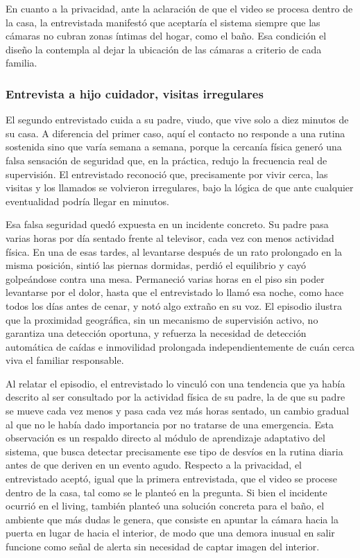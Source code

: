 En cuanto a la privacidad, ante la aclaración de que el video se procesa dentro de la casa, la entrevistada manifestó que aceptaría el sistema siempre que las cámaras no cubran zonas íntimas del hogar, como el baño.
Esa condición el diseño la contempla al dejar la ubicación de las cámaras a criterio de cada familia.

\subsubsection{Entrevista a hijo cuidador, visitas irregulares}

El segundo entrevistado cuida a su padre, viudo, que vive solo a diez minutos de su casa.
A diferencia del primer caso, aquí el contacto no responde a una rutina sostenida sino que varía semana a semana, porque la cercanía física generó una falsa sensación de seguridad que, en la práctica, redujo la frecuencia real de supervisión.
El entrevistado reconoció que, precisamente por vivir cerca, las visitas y los llamados se volvieron irregulares, bajo la lógica de que ante cualquier eventualidad podría llegar en minutos.

Esa falsa seguridad quedó expuesta en un incidente concreto.
Su padre pasa varias horas por día sentado frente al televisor, cada vez con menos actividad física.
En una de esas tardes, al levantarse después de un rato prolongado en la misma posición, sintió las piernas dormidas, perdió el equilibrio y cayó golpeándose contra una mesa.
Permaneció varias horas en el piso sin poder levantarse por el dolor, hasta que el entrevistado lo llamó esa noche, como hace todos los días antes de cenar, y notó algo extraño en su voz.
El episodio ilustra que la proximidad geográfica, sin un mecanismo de supervisión activo, no garantiza una detección oportuna, y refuerza la necesidad de detección automática de caídas e inmovilidad prolongada independientemente de cuán cerca viva el familiar responsable.

Al relatar el episodio, el entrevistado lo vinculó con una tendencia que ya había descrito al ser consultado por la actividad física de su padre, la de que su padre se mueve cada vez menos y pasa cada vez más horas sentado, un cambio gradual al que no le había dado importancia por no tratarse de una emergencia.
Esta observación es un respaldo directo al módulo de aprendizaje adaptativo del sistema, que busca detectar precisamente ese tipo de desvíos en la rutina diaria antes de que deriven en un evento agudo.
Respecto a la privacidad, el entrevistado aceptó, igual que la primera entrevistada, que el video se procese dentro de la casa, tal como se le planteó en la pregunta.
Si bien el incidente ocurrió en el living, también planteó una solución concreta para el baño, el ambiente que más dudas le genera, que consiste en apuntar la cámara hacia la puerta en lugar de hacia el interior, de modo que una demora inusual en salir funcione como señal de alerta sin necesidad de captar imagen del interior.

